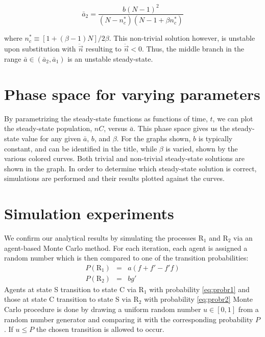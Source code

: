 \begin{equation}
\bar{a}_{2} = \frac{b(N-1)^{2}}{(N-n_{c}^{*})(N-1+\beta n_{c}^{*})}
\end{equation}

where $n_{c}^{*} \equiv [1+(\beta-1)N]/2\beta$.
This non-trivial solution however, is unstable upon substitution with $\ddot{\vec{n}}$ resulting to $\ddot{\vec{n}}<0$.
Thus, the middle branch in the range $\bar{a}\in(\bar{a}_{2},\bar{a}_{1})$ is an unstable steady-state.

\section{Phase space for varying parameters}
\hspace{\parindent} By parametrizing the steady-state functions as functions of time, $t$, we can plot the steady-state population, $nC$, versus $\bar{a}$. 
This phase space gives us the steady-state value for any given $\bar{a}$, $b$, and $\beta$. 
For the graphs shown, $b$ is typically constant, and can be identified in the title, while $\beta$ is varied, shown by the various colored curves. 
Both trivial and non-trivial steady-state solutions are shown in the graph. In order to determine which steady-state solution is correct, simulations are performed and their results plotted against the curves. 
 
\section{Simulation experiments}
\hspace{\parindent} We confirm our analytical results by simulating the processes $\mathrm{R}_{1}$ and $\mathrm{R}_{2}$ via an agent-based Monte Carlo method.
For each iteration, each agent is assigned a random number which is then compared to one of the transition probabilities:
\begin{eqnarray}
P(\mathrm{R}_{1}) &=& a(f+f'-f'f)\label{eq:probr1} \\ %
P(\mathrm{R}_{2}) &=& bg'\label{eq:probr2}
\end{eqnarray}
Agents at state S transition to state C via $\mathrm{R}_1$ with probability \eqref{eq:probr1} and those at state C transition to state S via $\mathrm{R}_2$ with probability  \eqref{eq:probr2}
Monte Carlo procedure 
is done by drawing a uniform random number $u \in [0,1]$ from a random number generator and comparing it with the corresponding probability $P$.
If $u\leq P$ the chosen transition is allowed to occur.

